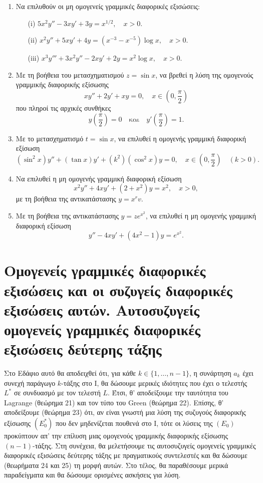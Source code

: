 \documentclass[11pt,a4paper,twoside]{book}
\newcommand{\eng}[1]{\selectlanguage{english}#1\selectlanguage{greek}}
\begin{document}
\begin{enumerate}
\begin{enumerate}
\end{enumerate}
\item Να επιλυθούν οι μη ομογενείς γραμμικές διαφορικές εξισώσεις:
\begin{enumerate}
    \item[(i)] $5x^2y''-3xy'+3y=x^{1/2}, \quad x>0$.
    \item[(ii)] $x^2y''+5xy'+4y=(x^{-3}-x^{-5})\log x, \quad x>0$.
    \item[(iii)] $x^3y'''+3x^2y''-2xy'+2y=x^2\log x, \quad x>0$.
\end{enumerate}
\item Με τη βοήθεια του μετασχηματισμού $z=\sin x$, να βρεθεί η λύση της ομογενούς γραμμικής διαφορικής εξίσωσης
\[
    xy''+2y'+xy=0, \quad x\in(0,\frac{\pi}{2})
\]
που πληροί τις αρχικές συνθήκες
\[
    y(\frac{\pi}{2})=0 \quad \text{και} \quad y'(\frac{\pi}{2})=1.
\]
\item Με το μετασχηματισμό $t=\sin x$, να επιλυθεί η ομογενής γραμμική διαφορική εξίσωση
\[
    (\sin^2x)y''+(\tan x)y'+(k^2)(\cos^2x)y=0, \quad x\in(0,\frac{\pi}{2}) \quad (k>0).
\]
\item Να επιλυθεί η μη ομογενής γραμμική διαφορική εξίσωση
\[
    x^2y''+4xy'+(2+x^2)y=x^2, \quad x>0,
\]
με τη βοήθεια της αντικατάστασης $y=x^rv$.
\item Με τη βοήθεια της αντικατάστασης $y=ze^{x^2}$, να επιλυθεί η
μη ομογενής γραμμική διαφορική εξίσωση
\[
    y''-4xy'+(4x^2-1)y=e^{x^2}.
\]
\end{enumerate}
\section{Ομογενείς γραμμικές διαφορικές εξισώσεις και οι συζυγείς διαφορικές εξισώσεις αυτών. Αυτοσυζυγείς ομογενείς γραμμικές διαφορικές εξισώσεις δεύτερης τάξης}
\thispagestyle{empty}
Στο Εδάφιο αυτό θα αποδειχθεί ότι, για κάθε $k\in\{1,\ldots,n-1\}$, η συνάρτηση $a_k$ έχει συνεχή παράγωγο $k$-τάξης στο Ι, θα δώσουμε μερικές ιδιότητες που έχει ο τελεστής $L^*$ σε συνδυασμό με τον τελεστή $L$. Έτσι, θ' αποδείξουμε την ταυτότητα του \eng{Lagrange} (θεώρημα 21) και τον τύπο του \eng{Green} (θεώρημα 22). Επίσης, θ' αποδείξουμε (θεώρημα 23) ότι, αν είναι γνωστή μια λύση της συζυγούς διαφορικής εξίσωσης $(E_0^*)$ που δεν μηδενίζεται πουθενά στο Ι, τότε οι λύσεις της $(E_0)$ προκύπτουν απ' την επίλυση μιας ομογενούς γραμμικής διαφορικής εξίσωσης $(n-1)$-τάξης. Στη συνέχεια, θα μελετήσουμε τις αυτοσυζυγείς ομογενείς γραμμικές διαφορικές εξισώσεις δεύτερης τάξης με πραγματικούς συντελεστές και θα δώσουμε (θεωρήματα 24 και 25) τη μορφή αυτών. Στο τέλος, θα παραθέσουμε μερικά παραδείγματα και θα δώσουμε ορισμένες ασκήσεις για λύση.
\end{document}

